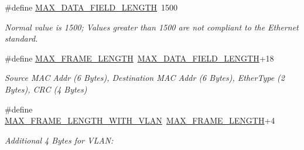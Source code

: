 \begin{DoxyCompactItemize}
\item 
\#define \mbox{\hyperlink{group__ethernet_ga7e41863aa11f513f9f3e6f29535b56e3}{M\+A\+X\+\_\+\+D\+A\+T\+A\+\_\+\+F\+I\+E\+L\+D\+\_\+\+L\+E\+N\+G\+TH}}~1500
\begin{DoxyCompactList}\small\item\em Normal value is 1500; Values greater than 1500 are not compliant to the Ethernet standard. \end{DoxyCompactList}\item 
\#define \mbox{\hyperlink{group__ethernet_gaecae779890dfc6b313fe2854369e5497}{M\+A\+X\+\_\+\+F\+R\+A\+M\+E\+\_\+\+L\+E\+N\+G\+TH}}~\mbox{\hyperlink{group__ethernet_ga7e41863aa11f513f9f3e6f29535b56e3}{M\+A\+X\+\_\+\+D\+A\+T\+A\+\_\+\+F\+I\+E\+L\+D\+\_\+\+L\+E\+N\+G\+TH}}+18
\begin{DoxyCompactList}\small\item\em Source M\+AC Addr (6 Bytes), Destination M\+AC Addr (6 Bytes), Ether\+Type (2 Bytes), C\+RC (4 Bytes) \end{DoxyCompactList}\item 
\#define \mbox{\hyperlink{group__ethernet_ga828c657a62d97cb7339451fc46589c6e}{M\+A\+X\+\_\+\+F\+R\+A\+M\+E\+\_\+\+L\+E\+N\+G\+T\+H\+\_\+\+W\+I\+T\+H\+\_\+\+V\+L\+AN}}~\mbox{\hyperlink{group__ethernet_gaecae779890dfc6b313fe2854369e5497}{M\+A\+X\+\_\+\+F\+R\+A\+M\+E\+\_\+\+L\+E\+N\+G\+TH}}+4
\begin{DoxyCompactList}\small\item\em Additional 4 Bytes for V\+L\+AN\+: \end{DoxyCompactList}\end{DoxyCompactItemize}
